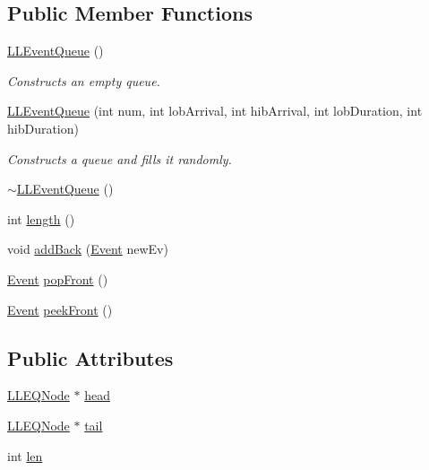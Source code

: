 \subsection*{Public Member Functions}
\begin{DoxyCompactItemize}
\item 
\hyperlink{class_l_l_event_queue_ab778c3122c7ac7ebfd0de6e1d469efad}{L\+L\+Event\+Queue} ()
\begin{DoxyCompactList}\small\item\em Constructs an empty queue. \end{DoxyCompactList}\item 
\hyperlink{class_l_l_event_queue_ac3a67029f7d9a85b6ec3a3daadf58bd3}{L\+L\+Event\+Queue} (int num, int lob\+Arrival, int hib\+Arrival, int lob\+Duration, int hib\+Duration)
\begin{DoxyCompactList}\small\item\em Constructs a queue and fills it randomly. \end{DoxyCompactList}\item 
\hyperlink{class_l_l_event_queue_a5bdaa10284e0fb6f3a51fc09ce6e2322}{$\sim$\+L\+L\+Event\+Queue} ()
\item 
int \hyperlink{class_l_l_event_queue_a6ca56aeb714d44bb3c93748c4fe87bb6}{length} ()
\item 
void \hyperlink{class_l_l_event_queue_a0965f4171186e119b2e63c1fbdafedd8}{add\+Back} (\hyperlink{struct_event}{Event} new\+Ev)
\item 
\hyperlink{struct_event}{Event} \hyperlink{class_l_l_event_queue_aad3c57796c1ba1e06933083d714722e7}{pop\+Front} ()
\item 
\hyperlink{struct_event}{Event} \hyperlink{class_l_l_event_queue_a363c623da23cfc4baa0ff29c1801759f}{peek\+Front} ()
\end{DoxyCompactItemize}
\subsection*{Public Attributes}
\begin{DoxyCompactItemize}
\item 
\hyperlink{struct_l_l_e_q_node}{L\+L\+E\+Q\+Node} $\ast$ \hyperlink{class_l_l_event_queue_a9f789093fd1f9af546885d589ccf3271}{head}
\item 
\hyperlink{struct_l_l_e_q_node}{L\+L\+E\+Q\+Node} $\ast$ \hyperlink{class_l_l_event_queue_a1f5ddd89f1a0b4c7e475b364b0084564}{tail}
\item 
int \hyperlink{class_l_l_event_queue_a86b7dfcff49beb1443b57d0610725c3b}{len}
\end{DoxyCompactItemize}


